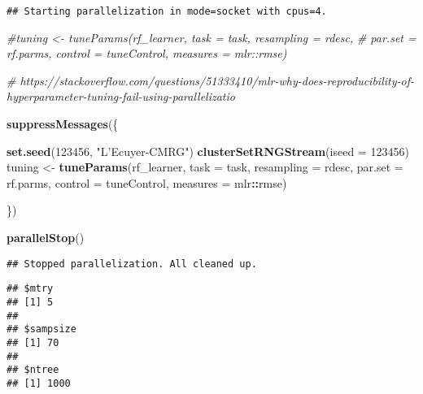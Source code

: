 \documentclass[
]{article}
\newenvironment{Shaded}{\begin{snugshade}}{\end{snugshade}}
\newcommand{\CommentTok}[1]{\textcolor[rgb]{0.56,0.35,0.01}{\textit{#1}}}
\newcommand{\DataTypeTok}[1]{\textcolor[rgb]{0.13,0.29,0.53}{#1}}
\newcommand{\DecValTok}[1]{\textcolor[rgb]{0.00,0.00,0.81}{#1}}
\newcommand{\KeywordTok}[1]{\textcolor[rgb]{0.13,0.29,0.53}{\textbf{#1}}}
\newcommand{\NormalTok}[1]{#1}
\newcommand{\OperatorTok}[1]{\textcolor[rgb]{0.81,0.36,0.00}{\textbf{#1}}}
\newcommand{\OtherTok}[1]{\textcolor[rgb]{0.56,0.35,0.01}{#1}}
\newcommand{\StringTok}[1]{\textcolor[rgb]{0.31,0.60,0.02}{#1}}
\begin{document}
\begin{verbatim}
## Starting parallelization in mode=socket with cpus=4.
\end{verbatim}

\begin{Shaded}
\begin{Highlighting}[]
\CommentTok{#tuning <- tuneParams(rf_learner, task = task, resampling = rdesc,}
\CommentTok{#                     par.set = rf.parms, control = tuneControl, measures = mlr::rmse)}

\CommentTok{# https://stackoverflow.com/questions/51333410/mlr-why-does-reproducibility-of-hyperparameter-tuning-fail-using-parallelizatio}

\KeywordTok{suppressMessages}\NormalTok{(\{}

  \KeywordTok{set.seed}\NormalTok{(}\DecValTok{123456}\NormalTok{, }\StringTok{"L'Ecuyer-CMRG"}\NormalTok{)}
  \KeywordTok{clusterSetRNGStream}\NormalTok{(}\DataTypeTok{iseed =} \DecValTok{123456}\NormalTok{)}
\NormalTok{  tuning <-}\StringTok{ }\KeywordTok{tuneParams}\NormalTok{(rf_learner, }\DataTypeTok{task =}\NormalTok{ task, }\DataTypeTok{resampling =}\NormalTok{ rdesc,}
                     \DataTypeTok{par.set =}\NormalTok{ rf.parms, }\DataTypeTok{control =}\NormalTok{ tuneControl, }\DataTypeTok{measures =}\NormalTok{ mlr}\OperatorTok{::}\NormalTok{rmse)}
  
\NormalTok{\})}

\KeywordTok{parallelStop}\NormalTok{()}
\end{Highlighting}
\end{Shaded}

\begin{verbatim}
## Stopped parallelization. All cleaned up.
\end{verbatim}

\begin{Shaded}
\end{Shaded}

\begin{verbatim}
## $mtry
## [1] 5
## 
## $sampsize
## [1] 70
## 
## $ntree
## [1] 1000
\end{verbatim}

\begin{Shaded}
\end{Shaded}
\end{document}

